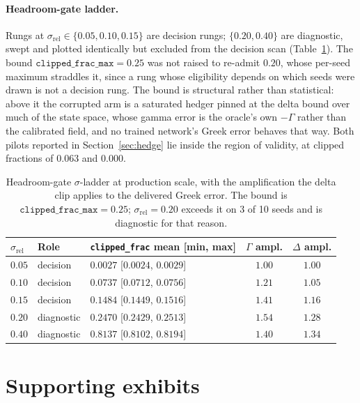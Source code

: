\documentclass[10pt]{article}
\begin{document}
\paragraph{Headroom-gate ladder.} Rungs at $\sigma_{\mathrm{rel}} \in
\{0.05, 0.10, 0.15\}$ are decision rungs; $\{0.20, 0.40\}$ are diagnostic, swept and
plotted identically but excluded from the decision scan (Table~\ref{tab:ladder}).
The bound $\texttt{clipped\_frac\_max} = 0.25$ was not raised to re-admit $0.20$,
whose per-seed maximum straddles it, since a rung whose eligibility depends on which
seeds were drawn is not a decision rung. The bound is structural rather than
statistical: above it the corrupted arm is a saturated hedger pinned at the delta
bound over much of the state space, whose gamma error is the oracle's own $-\Gamma$
rather than the calibrated field, and no trained network's Greek error behaves that
way. Both pilots reported in Section~\ref{sec:hedge} lie inside the region of
validity, at clipped fractions of $0.063$ and $0.000$.

\begin{table}[h]
\centering\footnotesize\setlength{\tabcolsep}{5pt}
\begin{tabular}{@{}lllcc@{}}
\toprule
$\sigma_{\mathrm{rel}}$ & Role & \texttt{clipped\_frac} mean [min, max] & $\Gamma$ ampl. & $\Delta$ ampl. \\
\midrule
$0.05$ & decision & $0.0027$ [$0.0024$, $0.0029$] & $1.00$ & $1.00$ \\
$0.10$ & decision & $0.0737$ [$0.0712$, $0.0756$] & $1.21$ & $1.05$ \\
$0.15$ & decision & $0.1484$ [$0.1449$, $0.1516$] & $1.41$ & $1.16$ \\
$0.20$ & diagnostic & $0.2470$ [$0.2429$, $0.2513$] & $1.54$ & $1.28$ \\
$0.40$ & diagnostic & $0.8137$ [$0.8102$, $0.8194$] & $1.40$ & $1.34$ \\
\bottomrule
\end{tabular}
\caption{Headroom-gate $\sigma$-ladder at production scale, with the amplification
the delta clip applies to the delivered Greek error. The bound is
$\texttt{clipped\_frac\_max} = 0.25$; $\sigma_{\mathrm{rel}} = 0.20$ exceeds it on
3 of 10 seeds and is diagnostic for that reason.}
\label{tab:ladder}
\end{table}

\section{Supporting exhibits}
\label{app:exhibits}
\end{document}
